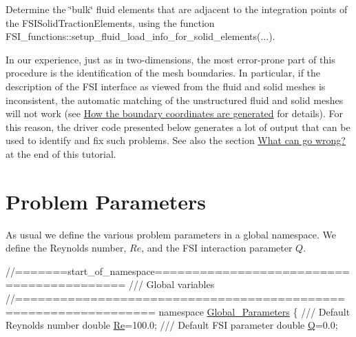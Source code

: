 \begin{DoxyEnumerate}
\item Determine the \char`\"{}bulk\char`\"{} fluid elements that are adjacent to the integration points of the {\ttfamily F\+S\+I\+Solid\+Traction\+Elements}, using the function {\ttfamily F\+S\+I\+\_\+functions\+::setup\+\_\+fluid\+\_\+load\+\_\+info\+\_\+for\+\_\+solid\+\_\+elements}(...). ~\newline
~\newline

\end{DoxyEnumerate}In our experience, just as in two-\/dimensions, the most error-\/prone part of this procedure is the identification of the mesh boundaries. In particular, if the description of the F\+SI interface as viewed from the fluid and solid meshes is inconsistent, the automatic matching of the unstructured fluid and solid meshes will not work (see \hyperlink{index_boundary_coord}{How the boundary coordinates are generated} for details). For this reason, the driver code presented below generates a lot of output that can be used to identify and fix such problems. See also the section \hyperlink{index_go_wrong}{What can go wrong?} at the end of this tutorial.



 

\hypertarget{index_namespace}{}\section{Problem Parameters}\label{index_namespace}
As usual we define the various problem parameters in a global namespace. We define the Reynolds number, $ Re $, and the F\+SI interaction parameter $ Q $.

 
\begin{DoxyCodeInclude}
\textcolor{comment}{//=======start\_of\_namespace==========================================}
\textcolor{comment}{/// Global variables}
\textcolor{comment}{}\textcolor{comment}{//================================================================}
\textcolor{keyword}{namespace }\hyperlink{namespaceGlobal__Parameters}{Global\_Parameters}
\{
\textcolor{comment}{}
\textcolor{comment}{ /// Default Reynolds number}
\textcolor{comment}{} \textcolor{keywordtype}{double} \hyperlink{namespaceGlobal__Parameters_a9d72e94a9305c6a310940a6a427ebe06}{Re}=100.0; 
\textcolor{comment}{}
\textcolor{comment}{ /// Default FSI parameter}
\textcolor{comment}{} \textcolor{keywordtype}{double} \hyperlink{namespaceGlobal__Parameters_a7814fddf663e56168174a42d2cd6b4c1}{Q}=0.0;

\end{DoxyCodeInclude}


